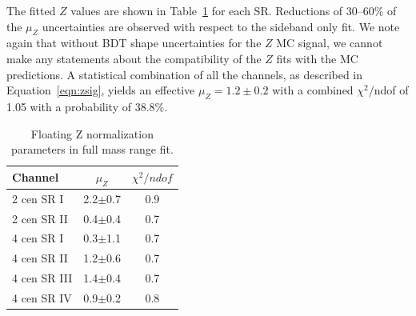 The fitted $Z$ values are shown in Table~\ref{tab:zfullfit} for each SR.  Reductions of 30--60\% of the $\mu_Z$ uncertainties are observed with respect to the sideband only fit.  We note again that without BDT shape uncertainties for the $Z$ MC signal, we cannot make any statements about the compatibility of the $Z$ fits with the MC predictions.  A statistical combination of all the channels, as described in Equation~\ref{eqn:zsig}, yields an effective $\mu_Z = 1.2 \pm 0.2$ with a combined $\chi^2/$ndof of 1.05 with a probability of 38.8\%.  

\begin{table}[htbp]
\centering
\caption{Floating Z normalization parameters in full mass range fit.}
\label{tab:zfullfit}
\begin{tabular}{|l|c|c|}
\hline
Channel      & $\mu_{Z}$   & $\chi^2/ndof$ \\ \hline
2 cen SR I   & 2.2$\pm$0.7  & 0.9      \\ \hline
2 cen SR II  & 0.4$\pm$0.4  & 0.7        \\ \hline
4 cen SR I   & 0.3$\pm$1.1  & 0.7         \\ \hline
4 cen SR II  & 1.2$\pm$0.6  & 0.7        \\ \hline
4 cen SR III & 1.4$\pm$0.4  & 0.7         \\ \hline
4 cen SR IV  & 0.9$\pm$0.2  & 0.8          \\ \hline
\end{tabular}
\end{table}


